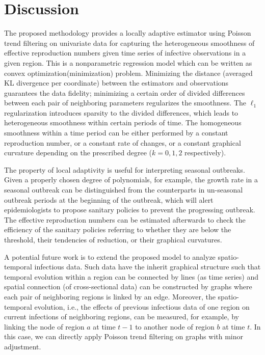 \section{Discussion}

The proposed methodology provides a locally adaptive estimator using Poisson trend filtering on univariate data for capturing the heterogeneous smoothness of effective reproduction numbers given time series of infective observations in a given region. This is a nonparametric regression model which can be written as convex optimization(minimization) problem. Minimizing the distance (averaged KL divergence per coordinate) between the estimators and observations guarantees the data fidelity; minimizing a certain order of divided differences between each pair of neighboring parameters regularizes the smoothness. The $\ell_1$ regularization introduces sparsity to the divided differences, which leads to heterogeneous smoothness within certain periods of time. The homogeneous smoothness within a time period can be either performed by a constant reproduction number, or a constant rate of changes, or a constant graphical curvature depending on the prescribed degree ($k=0,1,2$ respectively). %

The property of local adaptivity is useful for interpreting seasonal outbreaks. Given a properly chosen degree of polynomials, for example, the growth rate in a seasonal outbreak can be distinguished from the counterparts in un-seasonal outbreak periods at the beginning of the outbreak, which will alert epidemiologists to propose sanitary policies to prevent the progressing outbreak. The effective reproduction numbers can be estimated afterwards to check the efficiency of the sanitary policies referring to whether they are below the threshold, their tendencies of reduction, or their graphical curvatures.

A potential future work is to extend the proposed model to analyze spatio-temporal infectious data. Such data have the inherit graphical structure such that temporal evolution within a region can be connected by lines (as time series) and spatial connection (of cross-sectional data) can be constructed by graphs where each pair of neighboring regions is linked by an edge. Moreover, the spatio-temporal evolution, i.e., the effects of previous infectious data of one region on current infections of neighboring regions, can be measured, for example, by linking the node of region $a$ at time $t-1$ to another node of region $b$ at time $t$. 
In this case, we can directly apply Poisson trend filtering on graphs with minor adjustment. %


